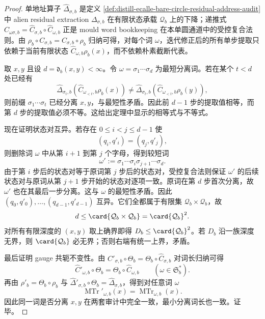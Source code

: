 \begin{proof}
单地址算子 \(\widehat\Delta_{\sigma,b}\) 是定义 \ref{def:distill-ecalle-bare-circle-residual-address-audit} 中 alien residual extraction \(\Delta_{\sigma,b}\) 在有限状态承载 \(\mathcal Q_b\) 上的下降；递推式
\(\widehat C_{\omega\sigma,b}=\widehat C_{\sigma,b}\circ\widehat C_{\omega,b}\)
正是 mould word bookkeeping 在本单圆通道中的受控复合法则。由
\(\rho_b\circ C_{\sigma,b}=\widehat C_{\sigma,b}\circ\rho_b\) 归纳可得，对每个词 \(\omega\)，迭代修正后的所有单步提取只依赖于当前有限状态 \(\widehat C_{\omega,b}\rho_b(x)\)，而不依赖朴素截断代表。

取 \(x,y\) 且设 \(d=\mathfrak d_b(x,y)<\infty\)。令
\(\omega=\sigma_1\cdots\sigma_d\) 为最短分离词。若在某个 \(t<d\) 处已经有
\[
\widehat\Delta_{\sigma_t,b}(\widehat C_{\omega_{<t},b}\rho_b(x))
\ne
\widehat\Delta_{\sigma_t,b}(\widehat C_{\omega_{<t},b}\rho_b(y)),
\]
则前缀 \(\sigma_1\cdots\sigma_t\) 已经分离 \(x,y\)，与最短性矛盾。因此前 \(d-1\) 步的提取值相等，而第 \(d\) 步的提取值必须不等。这给出定理中显示的相等式与不等式。

现在证明状态对互异。若存在 \(0\le i<j\le d-1\) 使
\[
(q_i,q'_i)=(q_j,q'_j),
\]
则删除词 \(\omega\) 中从第 \(i+1\) 到第 \(j\) 个字母，得到较短词
\[
\omega':=\sigma_1\cdots\sigma_i\sigma_{j+1}\cdots\sigma_d.
\]
由于第 \(i\) 步后的状态对等于原词第 \(j\) 步后的状态对，受控复合法则保证 \(\omega'\) 的后续状态对与原词从第 \(j+1\) 步开始的状态对逐项一致。原词在第 \(d\) 步首次分离，故 \(\omega'\) 也在其最后一步分离。这与 \(\omega\) 的最短性矛盾。因此
\((q_0,q'_0),\ldots,(q_{d-1},q'_{d-1})\) 互异。它们全都属于有限集 \(\mathcal Q_b\times\mathcal Q_b\)，故
\[
d\le \card{\mathcal Q_b\times\mathcal Q_b}=\card{\mathcal Q_b}^{2}.
\]
对所有有限深度的 \((x,y)\) 取上确界即得 \(D_b\le\card{\mathcal Q_b}^{2}\)。若 \(D_b\) 沿一族深度无界，则 \(\card{\mathcal Q_b}\) 必无界；否则右端有统一上界，矛盾。

最后证明 gauge 共轭不变性。由
\(\widehat C'_{\sigma,b}\circ\Theta_b=\Theta_b\circ\widehat C_{\sigma,b}\)
对词长归纳可得
\[
\widehat C'_{\omega,b}\circ\Theta_b=\Theta_b\circ\widehat C_{\omega,b}
\qquad(\omega\in\mathfrak S_b^*).
\]
再由
\(\rho'_b=\Theta_b\circ\rho_b\) 与
\(\widehat\Delta'_{\sigma,b}\circ\Theta_b=\widehat\Delta_{\sigma,b}\)，得到对任意词 \(\omega\)
\[
\operatorname{MTr}'_{\omega,b}(x)=\operatorname{MTr}_{\omega,b}(x).
\]
因此同一词是否分离 \(x,y\) 在两套审计中完全一致，最小分离词长也一致。证毕。
\end{proof}

